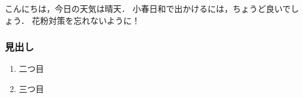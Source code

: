 \documentclass{ltjsbook}
\begin{document}
\lipsum[2]
こんにちは，今日の天気は晴天．
小春日和で出かけるには，ちょうど良いでしょう．
花粉対策を忘れないように！


\subsubsection{見出し}



\begin{enumerate}
\item 二つ目
\item 三つ目
\end{enumerate}












\end{document}
